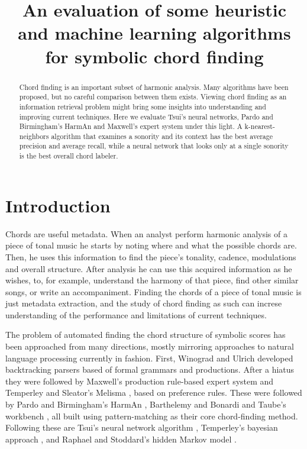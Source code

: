 \documentclass{article}
\title{An evaluation of some heuristic and machine learning algorithms for
  symbolic chord finding} \oneauthor {}{}
\begin{document}
\graphicspath{{figs/}{data/}}
\maketitle

\begin{abstract}
  Chord finding is an important subset of harmonic analysis. Many
  algorithms have been proposed, but no careful comparison between
  them exists. Viewing chord finding as an information retrieval
  problem might bring some insights into understanding and improving
  current techniques. Here we evaluate Tsui's neural networks, Pardo
  and Birmingham's HarmAn and Maxwell's expert system under this
  light. A k-nearest-neighbors algorithm that examines a sonority and
  its context has the best average precision and average recall, while
  a neural network that looks only at a single sonority is the best
  overall chord labeler.
\end{abstract}

\section{Introduction}
\label{sec:introduction}


Chords are useful metadata. When an analyst perform harmonic analysis
of a piece of tonal music he starts by noting where and what the
possible chords are. Then, he uses this information to find the
piece's tonality, cadence, modulations and overall structure. After
analysis he can use this acquired information as he wishes, to, for
example, understand the harmony of that piece, find other similar
songs, or write an accompaniment. Finding the chords of a piece of
tonal music is just metadata extraction, and the study of chord
finding as such can increse understanding of the performance and
limitations of current techniques.

The problem of automated finding the chord structure of symbolic
scores has been approached from many directions, mostly mirroring
approaches to natural language processing currently in fashion.
First, Winograd \cite{winograd:linguistics} and Ulrich
\cite{ulrich:analysis} developed backtracking parsers based of formal
grammars and productions. After a hiatus they were followed by
Maxwell's \cite{maxwell:expert} production rule-based expert system
and Temperley and Sleator's Melisma \cite{temperley.ea:modeling},
based on preference rules. These were followed by Pardo and
Birmingham's HarmAn \cite{pardo.ea:automated}, Barthelemy and Bonardi
\cite{barthelemy.ea:figured} and Taube's workbench
\cite{taube:automatic}, all built using pattern-matching as their core
chord-finding method. Following these are Tsui's
neural network algorithm \cite{tsui:harmonic}, Temperley's 
bayesian approach \cite{temperley:bayesian}, and Raphael and
Stoddard's hidden Markov model \cite{raphael.ea:harmonic}.
\end{document}
